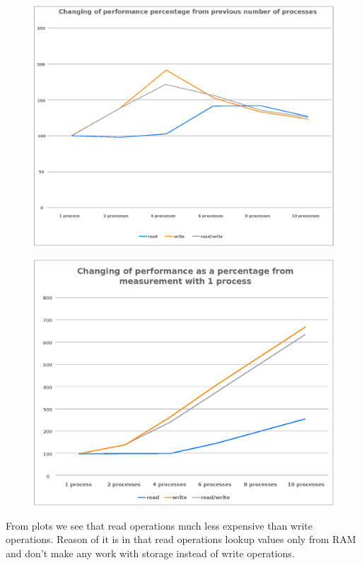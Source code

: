 \documentclass[final,a4paper]{article}
\begin{document}
\begin{figure}[H]
  \centering
  \includegraphics[scale=.7]{percentages.eps}
\end{figure}

\begin{figure}[H]
  \centering
  \includegraphics[scale=.6]{percentages1.eps}
\end{figure}

From plots we see that read operations much less expensive than write
operations. Reason of it is in that read operations lookup values only from RAM
and don’t make any work with storage instead of write operations.
\end{document}
